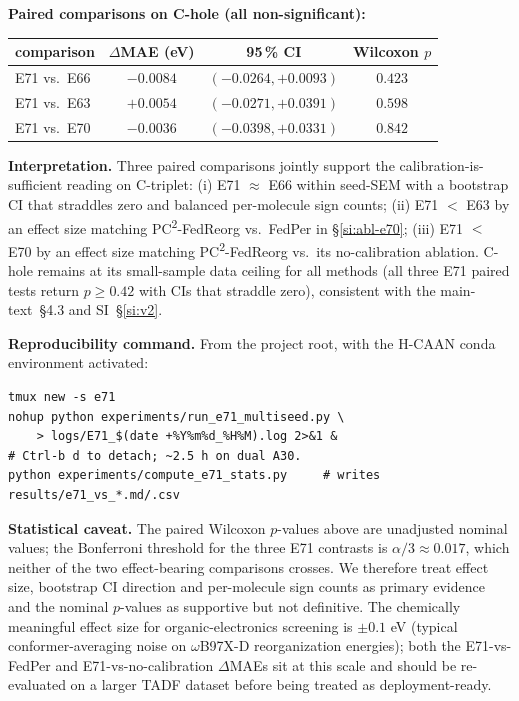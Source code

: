 \documentclass[11pt,a4paper]{article}
\newcommand{\PC}{PC\textsuperscript{2}-FedReorg}
\begin{document}
\textbf{Paired comparisons on C-hole (all non-significant):}

\begin{table}[h]
\centering
\footnotesize
\setlength{\tabcolsep}{4pt}
\begin{tabular}{lccc}
\toprule
comparison & $\Delta$MAE (eV) & 95\,\% CI & Wilcoxon $p$ \\
\midrule
E71 vs.\ E66 & $-0.0084$ & $(-0.0264, +0.0093)$ & $0.423$ \\
E71 vs.\ E63 & $+0.0054$ & $(-0.0271, +0.0391)$ & $0.598$ \\
E71 vs.\ E70 & $-0.0036$ & $(-0.0398, +0.0331)$ & $0.842$ \\
\bottomrule
\end{tabular}
\end{table}

\textbf{Interpretation.} Three paired comparisons jointly support the calibration-is-sufficient reading on C-triplet: (i) E71 $\approx$ E66 within seed-SEM with a bootstrap CI that straddles zero and balanced per-molecule sign counts; (ii) E71 $<$ E63 by an effect size matching \PC{} vs.\ FedPer in \S\ref{si:abl-e70}; (iii) E71 $<$ E70 by an effect size matching \PC{} vs.\ its no-calibration ablation. C-hole remains at its small-sample data ceiling for all methods (all three E71 paired tests return $p \ge 0.42$ with CIs that straddle zero), consistent with the main-text~\S4.3 and SI~\S\ref{si:v2}.

\textbf{Reproducibility command.} From the project root, with the H-CAAN conda environment activated:

\begin{verbatim}
tmux new -s e71
nohup python experiments/run_e71_multiseed.py \
    > logs/E71_$(date +%Y%m%d_%H%M).log 2>&1 &
# Ctrl-b d to detach; ~2.5 h on dual A30.
python experiments/compute_e71_stats.py     # writes results/e71_vs_*.md/.csv
\end{verbatim}

\textbf{Statistical caveat.} The paired Wilcoxon $p$-values above are unadjusted nominal values; the Bonferroni threshold for the three E71 contrasts is $\alpha/3 \approx 0.017$, which neither of the two effect-bearing comparisons crosses. We therefore treat effect size, bootstrap CI direction and per-molecule sign counts as primary evidence and the nominal $p$-values as supportive but not definitive. The chemically meaningful effect size for organic-electronics screening is $\pm 0.1$ eV (typical conformer-averaging noise on $\omega$B97X-D reorganization energies); both the E71-vs-FedPer and E71-vs-no-calibration $\Delta$MAEs sit at this scale and should be re-evaluated on a larger TADF dataset before being treated as deployment-ready.
\end{document}
